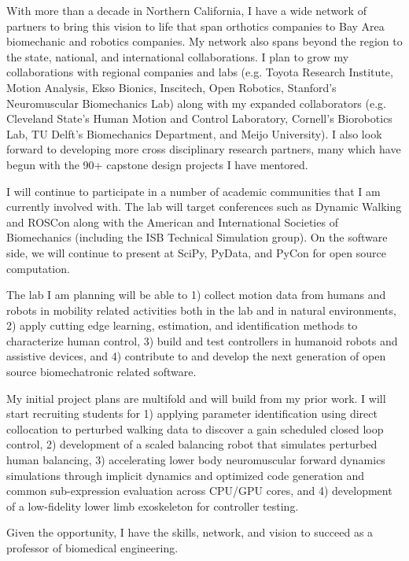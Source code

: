 \documentclass{article}
\begin{document}
With more than a decade in Northern California, I have a wide network of
partners to bring this vision to life that span orthotics companies to Bay Area
biomechanic and robotics companies. My network also spans beyond the region to
the state, national, and international collaborations. I plan to grow my
collaborations with regional companies and labs (e.g. Toyota Research
Institute, Motion Analysis, Ekso Bionics, Inscitech, Open Robotics, Stanford's
Neuromuscular Biomechanics Lab) along with my expanded collaborators (e.g.
Cleveland State's Human Motion and Control Laboratory, Cornell's Biorobotics
Lab, TU Delft's Biomechanics Department, and Meijo University). I also look
forward to developing more cross disciplinary research partners, many which
have begun with the 90+ capstone design projects I have mentored.

I will continue to participate in a number of academic communities that I am
currently involved with. The lab will target conferences such as Dynamic
Walking and ROSCon along with the American and International Societies of
Biomechanics (including the ISB Technical Simulation group). On the software
side, we will continue to present at SciPy, PyData, and PyCon for open source
computation.

The lab I am planning will be able to 1) collect motion data from humans and
robots in mobility related activities both in the lab and in natural
environments, 2) apply cutting edge learning, estimation, and identification
methods to characterize human control, 3) build and test controllers in
humanoid robots and assistive devices, and 4) contribute to and develop the
next generation of open source biomechatronic related software.

My initial project plans are multifold and will build from my prior work. I
will start recruiting students for 1) applying parameter identification using
direct collocation to perturbed walking data to discover a gain scheduled
closed loop control, 2) development of a scaled balancing robot that simulates
perturbed human balancing, 3) accelerating lower body neuromuscular forward
dynamics simulations through implicit dynamics and optimized code generation
and common sub-expression evaluation across CPU/GPU cores, and 4) development
of a low-fidelity lower limb exoskeleton for controller testing.

Given the opportunity, I have the skills, network, and vision to succeed as a
professor of biomedical engineering.



\end{document}
